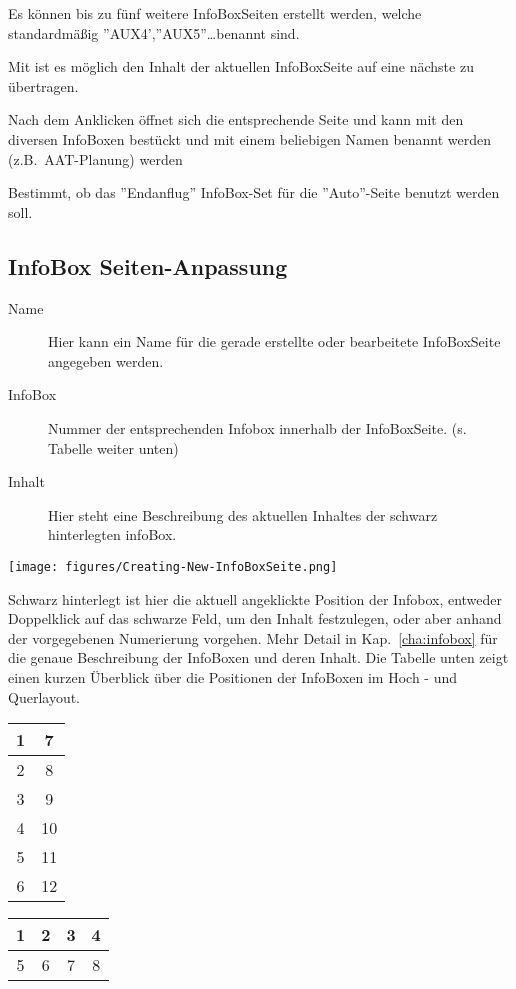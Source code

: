 Es können bis zu fünf weitere InfoBoxSeiten erstellt werden, welche
standardmäßig ''AUX4',''AUX5''\dots benannt sind.

Mit  ist es möglich den Inhalt der aktuellen InfoBoxSeite auf eine nächste zu übertragen.

Nach dem Anklicken öffnet sich die entsprechende Seite und kann mit den diversen InfoBoxen bestückt
und mit einem beliebigen Namen benannt werden (z.B.\ AAT-Planung) werden

  Bestimmt, ob das ''Endanflug'' InfoBox-Set für die
 ''Auto''-Seite benutzt werden soll.
%
\subsection*{InfoBox Seiten-Anpassung}
%
\begin{description}
\item[Name]  Hier kann ein Name für die gerade erstellte oder bearbeitete InfoBoxSeite angegeben werden.
\item[InfoBox]  Nummer der entsprechenden Infobox innerhalb der InfoBoxSeite. (s. Tabelle weiter unten)
\item[Inhalt]  Hier steht eine Beschreibung des aktuellen Inhaltes der schwarz hinterlegten infoBox.
\end{description}


\begin{center}
\texttt{[image: figures/Creating-New-InfoBoxSeite.png]}
\end{center}


Schwarz hinterlegt ist hier die aktuell angeklickte Position der Infobox, entweder Doppelklick auf das schwarze Feld, um
den Inhalt festzulegen, oder aber anhand der vorgegebenen Numerierung vorgehen. Mehr Detail in Kap.~\ref{cha:infobox} für die genaue Beschreibung der InfoBoxen und deren Inhalt.
Die Tabelle unten zeigt einen kurzen Überblick über die Positionen der InfoBoxen im Hoch - und Querlayout.
\begin{center}\begin{multicols}{2}
\begin{tabular}{|c|c|}
\hline
1 & 7 \\
\hline
2 & 8 \\
\hline
3 & 9 \\
\hline
4 & 10 \\
\hline
5 & 11 \\
\hline
6 & 12 \\
\hline
\end{tabular}

\begin{tabular}{|c|c|c|c|}
\hline
1 & 2 & 3 & 4 \\
\hline
\hline
5 & 6 & 7 & 8 \\
\hline
\end{tabular}
\end{multicols}
\end{center}
